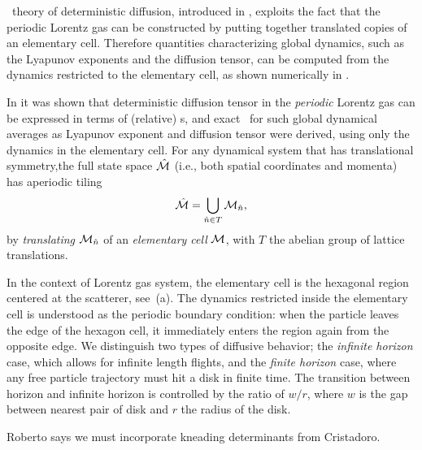 

\Po\ theory of deterministic diffusion, introduced in
, exploits the fact that the periodic Lorentz
gas can be constructed by putting together translated copies of an
elementary cell. Therefore quantities characterizing global dynamics,
such as the Lyapunov exponents and the diffusion tensor, can be computed
from the dynamics restricted to the elementary cell, as shown numerically
in .

In  it was shown that
deterministic diffusion tensor in the {\em periodic} Lorentz gas can be
expressed in terms of (relative) \po s, and exact \cycForm\ for such
global dynamical averages as Lyapunov exponent and diffusion tensor were
derived, using only the dynamics in the elementary cell. For any
dynamical system that has translational symmetry,the full state space
$\hat {{\cal M}}$ (i.e., both spatial coordinates and momenta) has aperiodic tiling
\[ %
\hM=\bigcup_{ \hn \in T} \pS_{\hn},
\] %
by {\em translating} ${\cal M}_{\hat{n}}$ of an {\em elementary cell} ${\cal M}$, with
$T$ the abelian group of lattice translations.

In the context of Lorentz gas system, the elementary cell is the
hexagonal region centered at the scatterer, see
\,(a). The dynamics restricted inside the
elementary cell is understood as the periodic boundary condition: when
the particle leaves the edge of the hexagon cell, it immediately enters
the region again from the opposite edge. We distinguish two types of
diffusive behavior; the {\em infinite horizon} case, which allows for
infinite length flights, and the {\em finite horizon} case, where any
free particle trajectory must hit a disk in finite time. The transition
between horizon and infinite horizon is controlled by the ratio of $w/r$,
where $w$ is the gap between nearest pair of disk and $r$ the radius of
the disk.

    { Roberto says we must
incorporate kneading determinants from
Cristadoro.
    }



